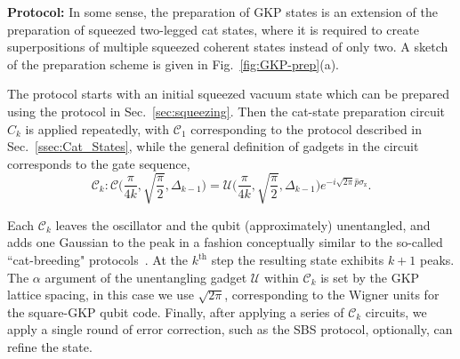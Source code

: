 \documentclass[aps,prx,showpacs,notitlepage,twocolumn,superscriptaddress,nofootinbib,preprintnumbers,floatfix,10pt, longbibliography]{revtex4-2}
\begin{document}


\par\textbf{Protocol:} In some sense, the preparation of GKP states is an extension of the preparation of squeezed two-legged cat states, where it is required to create superpositions of multiple squeezed coherent states instead of only two. A sketch of the preparation scheme is given in Fig.~\ref{fig:GKP-prep}(a).

The protocol starts with an initial squeezed vacuum state which can be prepared using the protocol in Sec.~\ref{sec:squeezing}. Then the cat-state preparation circuit $C_k$ is applied repeatedly, with $\mathcal{C}_1$ corresponding to the protocol described in Sec.~\ref{ssec:Cat_States}, while the general definition of gadgets in the circuit corresponds to the gate sequence, 
\begin{equation}  \mathcal{C}_k:\mathcal{C}\Big(\frac{\pi}{4k},\sqrt{\frac{\pi}{2}},\Delta_{k-1}\Big)=\mathcal{U}\Big(\frac{\pi}{4k},\sqrt{\frac{\pi}{2}},\Delta_{k-1}\Big)e^{-i\sqrt{2\pi}\hat p\sigma_\mathrm{z}}\label{GKP-circuit}.
\end{equation}

Each $\mathcal C_k$ leaves the oscillator and the qubit (approximately) unentangled, and adds one Gaussian to the peak in a fashion conceptually similar to the so-called ``cat-breeding" protocols~\cite{PhysRevA.97.022341}. At the $k^\mathrm{th}$ step the resulting state exhibits $k+1$ peaks. The $\alpha$ argument of the unentangling gadget $\mathcal U$ within $\mathcal{C}_k$ is set by the GKP lattice spacing, in this case we use $\sqrt{2\pi}$, corresponding to the Wigner units for the square-GKP qubit code. Finally, after applying a series of $\mathcal C_k$ circuits, we apply a single round of error correction, such as the SBS protocol, optionally, can refine the state. 
\end{document}
